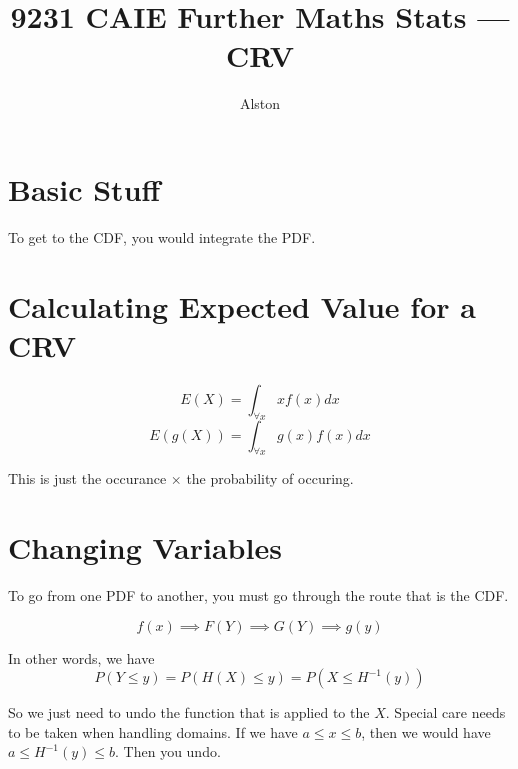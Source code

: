 \documentclass{article}
\title{9231 CAIE Further Maths Stats — CRV }
\author{Alston}
\date{}
\theoremstyle{mytheoremstyle}
\theoremstyle{mytheoremstyle}
\theoremstyle{myproblemstyle}
\begin{document}
    \maketitle
    
    \section{Basic Stuff}
    To get to the CDF, you would integrate the PDF.


    \section{Calculating Expected Value for a CRV}
    
    \begin{theorem}
    \[E(X) = \displaystyle\int_{\forall x} xf(x) dx\]
    \[E(g(X)) = \displaystyle\int_{\forall x} g(x)f(x) dx\]    
    \end{theorem}

    This is just the occurance $\times$ the probability of occuring.

    \section{Changing Variables}

    To go from one PDF to another, you must go through the route that is the CDF.

    \begin{theorem}
        \[f(x) \implies F(Y) \implies G(Y) \implies g(y)\]
    \end{theorem}

    In other words, we have
    \[P(Y \leq y) = P(H(X) \leq y) = P(X \leq H^{-1}(y))\]

    So we just need to undo the function that is applied to the $X$. Special care needs to be taken when handling domains. If we have $a \leq x \leq b$, then we would have $a \leq H^{-1}(y) \leq b$. Then you undo. 
\end{document}
